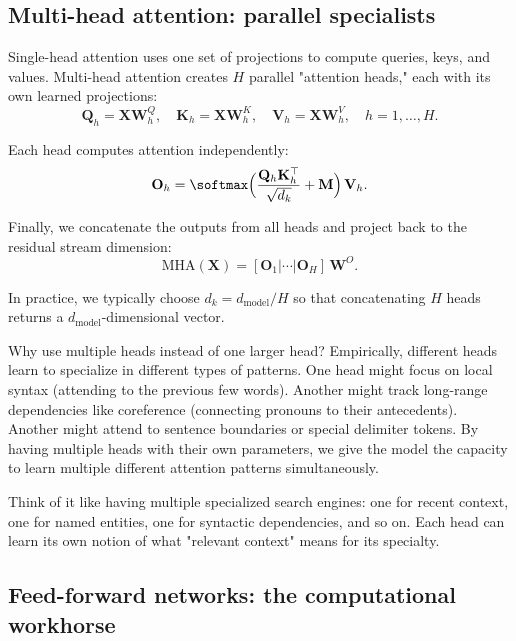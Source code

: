 \subsection{Multi-head attention: parallel specialists}
\label{sec:mha}

Single-head attention uses one set of projections to compute queries, keys, and values. Multi-head attention creates $H$ parallel "attention heads," each with its own learned projections:
\begin{equation}
\mathbf{Q}_h=\mathbf{X}\mathbf{W}_h^Q,\quad
\mathbf{K}_h=\mathbf{X}\mathbf{W}_h^K,\quad
\mathbf{V}_h=\mathbf{X}\mathbf{W}_h^V,\quad h=1,\dots,H.
\end{equation}

Each head computes attention independently:
\begin{equation}
\mathbf{O}_h=\softmax\Big(\frac{\mathbf{Q}_h\mathbf{K}_h^\top}{\sqrt{d_k}} + \mathbf{M}\Big)\,\mathbf{V}_h.
\end{equation}

Finally, we concatenate the outputs from all heads and project back to the residual stream dimension:
\begin{equation}
\mathrm{MHA}(\mathbf{X}) = [\mathbf{O}_1|\cdots|\mathbf{O}_H]\, \mathbf{W}^O.
\end{equation}

In practice, we typically choose $d_k = d_{\text{model}}/H$ so that concatenating $H$ heads returns a $d_{\text{model}}$-dimensional vector.

Why use multiple heads instead of one larger head? Empirically, different heads learn to specialize in different types of patterns. One head might focus on local syntax (attending to the previous few words). Another might track long-range dependencies like coreference (connecting pronouns to their antecedents). Another might attend to sentence boundaries or special delimiter tokens. By having multiple heads with their own parameters, we give the model the capacity to learn multiple different attention patterns simultaneously.

Think of it like having multiple specialized search engines: one for recent context, one for named entities, one for syntactic dependencies, and so on. Each head can learn its own notion of what "relevant context" means for its specialty.

\subsection{Feed-forward networks: the computational workhorse}
\label{sec:ffn}

